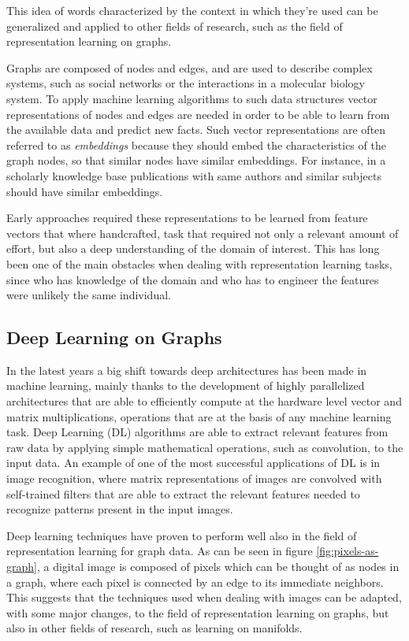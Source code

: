 \documentclass[%
    corpo=13.5pt,
    twoside,
    oldstyle,
    tipotesi=magistrale,
    greek,
    evenboxes
]{toptesi}
\begin{document}
This idea of words characterized by the context in which they're used
can be generalized and applied to other fields of research, such as
the field of representation learning on graphs.

Graphs are composed of nodes and edges, and are used to describe complex
systems, such as social networks or the interactions in a molecular biology
system. To apply machine learning algorithms to such data structures
vector representations of nodes and edges are needed in order
to be able to learn from the available data and predict new facts.
Such vector representations are often referred to as \emph{embeddings} because
they should embed the characteristics of the graph nodes, so that similar nodes
have similar embeddings. For instance, in a scholarly knowledge base publications
with same authors and similar subjects should have similar embeddings.

Early approaches required these representations to be learned from feature
vectors that where handcrafted, task that required not
only a relevant amount of effort, but also a deep understanding of the domain
of interest. This has long been one of the main obstacles when dealing with
representation learning tasks, since who has knowledge of the domain and who
has to engineer the features were unlikely the same individual.


\subsection{Deep Learning on Graphs}

In the latest years a big shift towards deep architectures has been made
in machine learning, mainly thanks to the development of highly
parallelized architectures that are able to efficiently compute
at the hardware level vector and matrix multiplications, operations that
are at the basis of any machine learning task.
Deep Learning (DL) algorithms are able to extract relevant features from
raw data by applying simple mathematical operations, such as convolution, to
the input data.
An example of one of the most successful applications of DL is in
image recognition, where matrix representations of images are
convolved with self-trained filters that are able to
extract the relevant features needed to recognize patterns present
in the input images.

Deep learning techniques have proven to perform well also in the field of
representation learning for graph data.
As can be seen in figure \ref{fig:pixels-as-graph}, a digital image
is composed of pixels which can be thought of as nodes in a graph, where
each pixel is connected by an edge to its immediate neighbors. This suggests
that the techniques used when dealing with images can be adapted, with
some major changes, to the field of representation learning on graphs, but
also in other fields of research, such as learning on manifolds.
\end{document}
